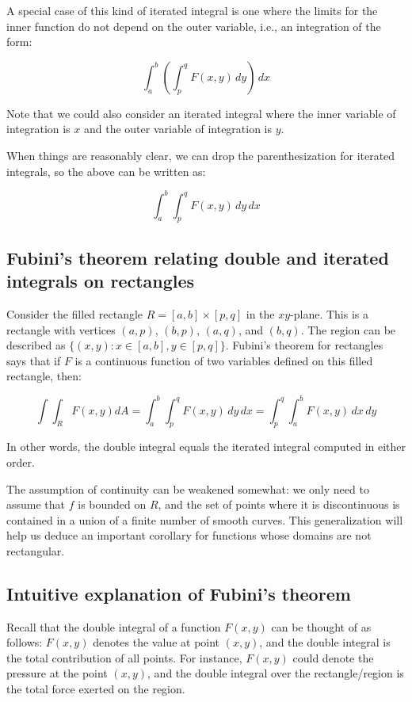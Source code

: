 \documentclass[10pt]{amsart}
\begin{document}
A special case of this kind of iterated integral is one where the
limits for the inner function do not depend on the outer variable,
i.e., an integration of the form:

$$\int_a^b \left(\int_p^q F(x,y) \, dy \right) \, dx$$

Note that we could also consider an iterated integral where the inner
variable of integration is $x$ and the outer variable of integration
is $y$.

When things are reasonably clear, we can drop the parenthesization for
iterated integrals, so the above can be written as:

$$\int_a^b \int_p^q F(x,y) \, dy \, dx$$

\subsection{Fubini's theorem relating double and iterated integrals on rectangles}

Consider the filled rectangle $R = [a,b] \times [p,q]$ in the
$xy$-plane. This is a rectangle with vertices $(a,p)$, $(b,p)$,
$(a,q)$, and $(b,q)$. The region can be described as $\{ (x,y) : x \in
[a,b], y \in [p,q] \}$. Fubini's theorem for rectangles says that if
$F$ is a continuous function of two variables defined on this filled
rectangle, then:

$$\int \int_R F(x,y) dA = \int_a^b \int_p^q F(x,y) \, dy \, dx = \int_p^q \int_a^b F(x,y) \, dx \, dy$$

In other words, the double integral equals the iterated integral
computed in either order.

The assumption of continuity can be weakened somewhat: we only need to
assume that $f$ is bounded on $R$, and the set of points where it is
discontinuous is contained in a union of a finite number of smooth
curves. This generalization will help us deduce an important corollary
for functions whose domains are not rectangular.

\subsection{Intuitive explanation of Fubini's theorem}

Recall that the double integral of a function $F(x,y)$ can be thought
of as follows: $F(x,y)$ denotes the value at point $(x,y)$, and the
double integral is the total contribution of all points. For instance,
$F(x,y)$ could denote the pressure at the point $(x,y)$, and the
double integral over the rectangle/region is the total force exerted
on the region.
\end{document}
